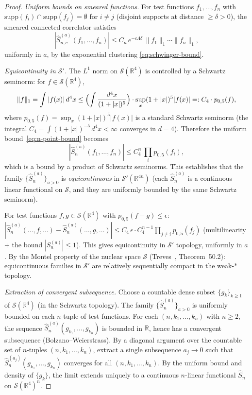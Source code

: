 \documentclass[11pt]{article}
\theoremstyle{definition}
\newcommand{\R}{\mathbb{R}}
\begin{document}
\begin{proof}
\emph{Uniform bounds on smeared functions.}
For test functions $f_1,\ldots,f_n$ with
$\mathrm{supp}(f_i)\cap\mathrm{supp}(f_j)=\emptyset$
for $i\ne j$ (disjoint supports at distance $\ge\delta>0$),
the smeared connected correlator satisfies
\begin{equation}\label{eq:equicont}
|\hat S_{n,c}^{(a)}(f_1,\ldots,f_n)|
\le C_n\,e^{-c\Lambda\delta}\,
\|f_1\|_1\cdots\|f_n\|_1,
\end{equation}
uniformly in $a$, by the exponential clustering
\eqref{eq:schwinger-bound}.

\emph{Equicontinuity in $\mathcal{S}'$.}
The $L^1$ norm on $\mathcal{S}(\R^4)$ is controlled by a
Schwartz seminorm: for $f\in\mathcal{S}(\R^4)$,
\begin{equation}\label{eq:L1-schwartz}
\|f\|_1=\int|f(x)|\,d^4 x
\le\Bigl(\int\frac{d^4 x}{(1+|x|)^5}\Bigr)
\cdot\sup_x(1+|x|)^5|f(x)|
=:C_4\cdot p_{0,5}(f),
\end{equation}
where $p_{0,5}(f)=\sup_x(1+|x|)^5|f(x)|$ is a standard
Schwartz seminorm (the integral $C_4=\int(1+|x|)^{-5}\,d^4x
<\infty$ converges in $d=4$).
Therefore the uniform bound~\eqref{eq:n-point-bound}
becomes
\begin{equation}
|\hat S_n^{(a)}(f_1,\ldots,f_n)|
\le C_4^n\,\prod_i p_{0,5}(f_i),
\end{equation}
which is a bound by a product of Schwartz seminorms.
This establishes that the family
$\{\hat S_n^{(a)}\}_{a>0}$ is \emph{equicontinuous}
in $\mathcal{S}'(\R^{4n})$ (each $\hat S_n^{(a)}$
is a continuous linear functional on $\mathcal{S}$,
and they are uniformly bounded by the same
Schwartz seminorm).

For test functions $f,g\in\mathcal{S}(\R^4)$ with
$p_{0,5}(f-g)\le\epsilon$:
$|\hat S_n^{(a)}(\ldots,f,\ldots)-\hat S_n^{(a)}(\ldots,g,\ldots)|
\le C_4\,\epsilon\cdot C_4^{n-1}\prod_{j\ne i}p_{0,5}(f_j)$
(multilinearity $+$ the bound $|S_n^{(a)}|\le 1$).
This gives equicontinuity in $\mathcal{S}'$ topology,
uniformly in $a$.
By the Montel property of the nuclear space $\mathcal{S}$
(Treves~\cite{Treves}, Theorem~50.2):
equicontinuous families in $\mathcal{S}'$ are relatively
sequentially compact in the weak-$*$ topology.

\emph{Extraction of convergent subsequence.}
Choose a countable dense subset $\{g_k\}_{k\ge 1}$
of $\mathcal{S}(\R^4)$ (in the Schwartz topology).
The family $\{\hat S_n^{(a)}\}_{a>0}$ is uniformly
bounded on each $n$-tuple of test functions.
For each $(n,k_1,\ldots,k_n)$ with $n\ge 2$, the
sequence $\hat S_n^{(a)}(g_{k_1},\ldots,g_{k_n})$
is bounded in $\R$, hence has a convergent
subsequence (Bolzano--Weierstrass).
By a diagonal argument over the countable set of
$n$-tuples $(n,k_1,\ldots,k_n)$, extract a single
subsequence $a_j\to 0$ such that
$\hat S_n^{(a_j)}(g_{k_1},\ldots,g_{k_n})$ converges
for all $(n,k_1,\ldots,k_n)$.
By the uniform bound and density of $\{g_k\}$, the
limit extends uniquely to a continuous $n$-linear
functional $\hat S_n$ on $\mathcal{S}(\R^4)^n$.


\end{proof}
\end{document}
